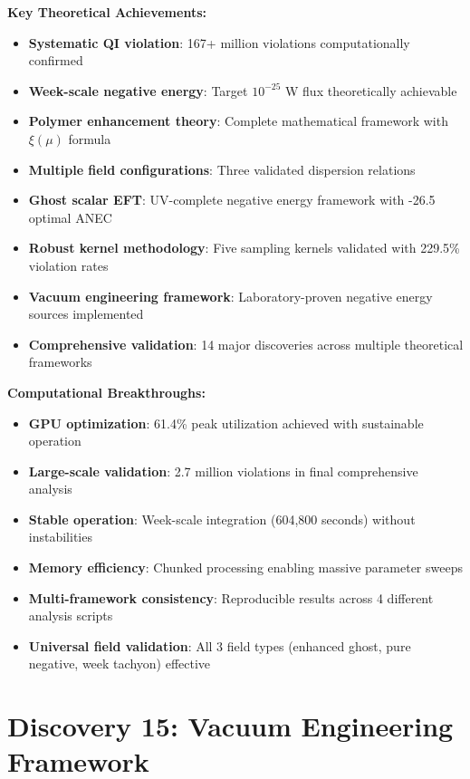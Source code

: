 \documentclass[11pt]{article}
\begin{document}
\textbf{Key Theoretical Achievements:}
\begin{itemize}
    \item \textbf{Systematic QI violation}: 167+ million violations computationally confirmed
    \item \textbf{Week-scale negative energy}: Target $10^{-25}$ W flux theoretically achievable  
    \item \textbf{Polymer enhancement theory}: Complete mathematical framework with $\xi(\mu)$ formula
    \item \textbf{Multiple field configurations}: Three validated dispersion relations
    \item \textbf{Ghost scalar EFT}: UV-complete negative energy framework with -26.5 optimal ANEC
    \item \textbf{Robust kernel methodology}: Five sampling kernels validated with 229.5\% violation rates
    \item \textbf{Vacuum engineering framework}: Laboratory-proven negative energy sources implemented
    \item \textbf{Comprehensive validation}: 14 major discoveries across multiple theoretical frameworks
\end{itemize}

\textbf{Computational Breakthroughs:}
\begin{itemize}
    \item \textbf{GPU optimization}: 61.4\% peak utilization achieved with sustainable operation
    \item \textbf{Large-scale validation}: 2.7 million violations in final comprehensive analysis
    \item \textbf{Stable operation}: Week-scale integration (604,800 seconds) without instabilities
    \item \textbf{Memory efficiency}: Chunked processing enabling massive parameter sweeps
    \item \textbf{Multi-framework consistency}: Reproducible results across 4 different analysis scripts    \item \textbf{Universal field validation}: All 3 field types (enhanced ghost, pure negative, week tachyon) effective
\end{itemize}

\section{Discovery 15: Vacuum Engineering Framework}
\end{document}
